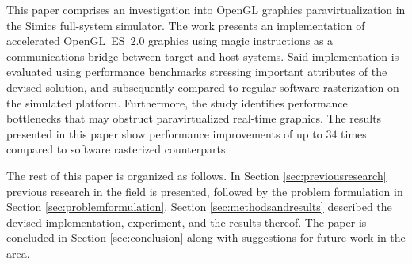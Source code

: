 This paper comprises an investigation into OpenGL graphics paravirtualization in the Simics full-system simulator.
The work presents an implementation of accelerated OpenGL~ES~$2.0$ graphics using magic instructions as a communications bridge between target and host systems.
Said implementation is evaluated using performance benchmarks stressing important attributes of the devised solution, and subsequently compared to regular software rasterization on the simulated platform.
Furthermore, the study identifies performance bottlenecks that may obstruct paravirtualized real-time graphics.
The results presented in this paper show performance improvements of up to $34$ times compared to software rasterized counterparts.

The rest of this paper is organized as follows.
In Section \ref{sec:previousresearch} previous research in the field is presented, followed by the problem formulation in Section \ref{sec:problemformulation}.
Section \ref{sec:methodsandresults} described the devised implementation, experiment, and the results thereof.
The paper is concluded in Section \ref{sec:conclusion} along with suggestions for future work in the area.
